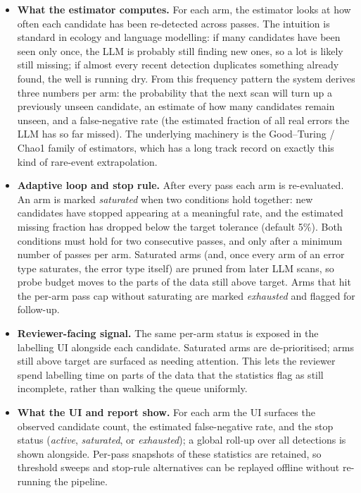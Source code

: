 \documentclass[11pt]{article}
\begin{document}
\begin{itemize}
  \item \textbf{What the estimator computes.} For each
    arm, the estimator looks at how often each candidate
    has been re-detected across passes. The intuition is
    standard in ecology and language modelling: if many
    candidates have been seen only once, the LLM is
    probably still finding new ones, so a lot is likely
    still missing; if almost every recent detection
    duplicates something already found, the well is
    running dry. From this frequency pattern the system
    derives three numbers per arm: the probability that
    the next scan will turn up a previously unseen
    candidate, an estimate of how many candidates remain
    unseen, and a false-negative rate (the estimated
    fraction of all real errors the LLM has so far
    missed). The underlying machinery is the
    Good--Turing / Chao1 family of estimators, which has
    a long track record on exactly this kind of
    rare-event extrapolation.
  \item \textbf{Adaptive loop and stop rule.} After every
    pass each arm is re-evaluated. An arm is marked
    \emph{saturated} when two conditions hold together:
    new candidates have stopped appearing at a meaningful
    rate, and the estimated missing fraction has dropped
    below the target tolerance (default 5\%). Both
    conditions must hold for two consecutive passes, and
    only after a minimum number of passes per arm.
    Saturated arms (and, once every arm of an error type
    saturates, the error type itself) are pruned from
    later LLM scans, so probe budget moves to the parts of
    the data still above target. Arms that hit the per-arm
    pass cap without saturating are marked
    \emph{exhausted} and flagged for follow-up.
  \item \textbf{Reviewer-facing signal.} The same per-arm
    status is exposed in the labelling UI alongside each
    candidate. Saturated arms are de-prioritised; arms
    still above target are surfaced as needing attention.
    This lets the reviewer spend labelling time on parts
    of the data that the statistics flag as still
    incomplete, rather than walking the queue uniformly.
  \item \textbf{What the UI and report show.} For each
    arm the UI surfaces the observed candidate count, the
    estimated false-negative rate, and the stop status
    (\emph{active}, \emph{saturated}, or \emph{exhausted});
    a global roll-up over all detections is shown
    alongside. Per-pass snapshots of these statistics are
    retained, so threshold sweeps and stop-rule
    alternatives can be replayed offline without
    re-running the pipeline.
\end{itemize}
\end{document}
